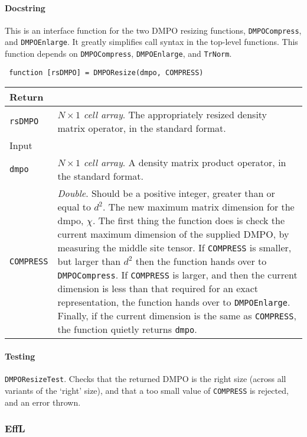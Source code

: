  \paragraph{Docstring} This is an interface function for the two DMPO resizing functions, \lstinline$DMPOCompress$, and \lstinline$DMPOEnlarge$. It greatly simplifies call syntax in the top-level functions. This function depends on \lstinline$DMPOCompress$, \lstinline$DMPOEnlarge$, and \lstinline$TrNorm$.
 \begin{lstlisting}
 function [rsDMPO] = DMPOResize(dmpo, COMPRESS) \end{lstlisting}
 \begin{longtabu}{X[1,1]X[4,1]}
 \hline
 Return & \\ \hline
 \lstinline$rsDMPO$ & \emph{\(N \times 1\) cell array}. The appropriately resized density matrix operator, in the standard format. \\ \hline
 Input & \\ \hline
 \lstinline$dmpo$ & \emph{\(N \times 1\) cell array}. A density matrix product operator, in the standard format. \\
 \lstinline$COMPRESS$ & \emph{Double}. Should be a positive integer, greater than or equal to \(d^{2}\). The new maximum matrix dimension for the dmpo, \(\chi\). The first thing the function does is check the current maximum dimension of the supplied DMPO, by measuring the middle site tensor. If \lstinline$COMPRESS$ is smaller, but larger than \(d^{2}\) then the function hands over to \lstinline$DMPOCompress$. If \lstinline$COMPRESS$ is larger, and then the current dimension is less than that required for an exact representation, the function hands over to \lstinline$DMPOEnlarge$. Finally, if the current dimension is the same as \lstinline$COMPRESS$, the function quietly returns \lstinline$dmpo$. \\
 \hline
 \end{longtabu}
 \paragraph{Testing} \lstinline$DMPOResizeTest$. Checks that the returned DMPO is the right size (across all variants of the `right' size), and that a too small value of \lstinline$COMPRESS$ is rejected, and an error thrown.

 \subsubsection{EffL}
